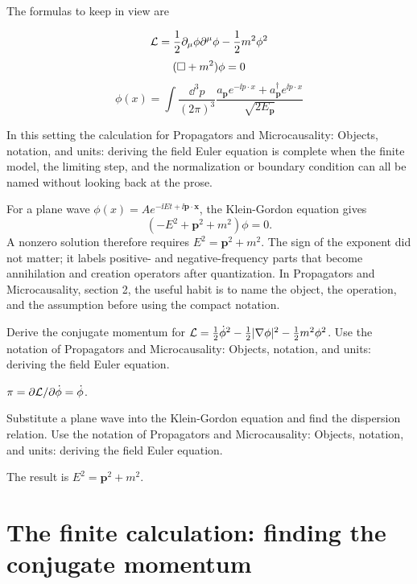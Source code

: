 The formulas to keep in view are

\[
  \mathcal L=\frac12\partial_\mu\phi\partial^\mu\phi-\frac12m^2\phi^2
\]
\[
  (\Box+m^2)\phi=0
\]
\[
  \phi(x)=\int\frac{\dd^3p}{(2\pi)^3}\frac{a_{\bm p}e^{-\ii p\cdot x}+a_{\bm p}^\dagger e^{\ii p\cdot x}}{\sqrt{2E_{\bm p}}}
\]

In this setting the calculation for Propagators and Microcausality: Objects, notation, and units: deriving the field Euler equation is complete when the finite model, the limiting step, and the normalization or boundary condition can all be named without looking back at the prose.




\begin{example}
For a plane wave \(\phi(x)=Ae^{-\ii Et+\ii\bm p\cdot\bm x}\), the Klein-Gordon equation gives
\[
  (-E^2+\bm p^2+m^2)\phi=0.
\]
A nonzero solution therefore requires \(E^2=\bm p^2+m^2\).  The sign of the exponent did not matter; it labels positive- and negative-frequency parts that become annihilation and creation operators after quantization.  In Propagators and Microcausality, section 2, the useful habit is to name the object, the operation, and the assumption before using the compact notation.
\end{example}



\begin{exercise}
Derive the conjugate momentum for \(\mathcal L=\frac12\dot\phi^2-\frac12|\nabla\phi|^2-\frac12m^2\phi^2\).  Use the notation of Propagators and Microcausality: Objects, notation, and units: deriving the field Euler equation.
\begin{answer}
\(\pi=\partial\mathcal L/\partial\dot\phi=\dot\phi\).
\end{answer}
\end{exercise}

\begin{exercise}
Substitute a plane wave into the Klein-Gordon equation and find the dispersion relation.  Use the notation of Propagators and Microcausality: Objects, notation, and units: deriving the field Euler equation.
\begin{answer}
The result is \(E^2=\bm p^2+m^2\).
\end{answer}
\end{exercise}



\section{The finite calculation: finding the conjugate momentum}

